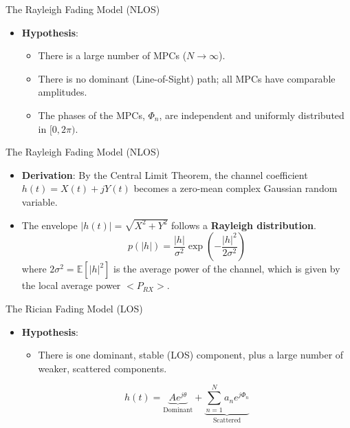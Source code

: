 \documentclass{beamer}
\begin{document}
	\begin{frame}{The Rayleigh Fading Model (NLOS)}
		\begin{itemize}
			\item \textbf{Hypothesis}:
			\begin{itemize}
				\item There is a large number of MPCs ($N \to \infty$).
				\item There is no dominant (Line-of-Sight) path; all MPCs have comparable amplitudes.
				\item The phases of the MPCs, $\Phi_n$, are independent and uniformly distributed in $[0, 2\pi)$.
			\end{itemize}
		\end{itemize}
	\end{frame}
	
	\begin{frame}{The Rayleigh Fading Model (NLOS)}
		\begin{itemize}
			\item \textbf{Derivation}: By the Central Limit Theorem, the channel coefficient $h(t) = X(t) + jY(t)$ becomes a zero-mean complex Gaussian random variable.
			\item The envelope $|h(t)| = \sqrt{X^2 + Y^2}$ follows a \textbf{Rayleigh distribution}.
			\[ p(|h|) = \frac{|h|}{\sigma^2} \exp\left(-\frac{|h|^2}{2\sigma^2}\right) \]
			where $2\sigma^2 = \mathbb{E}[|h|^2]$ is the average power of the channel, which is given by the local average power $<P_{RX}>$.
		\end{itemize}
	\end{frame}
	
	\begin{frame}{The Rician Fading Model (LOS)}
		\begin{itemize}
			\item \textbf{Hypothesis}:
			\begin{itemize}
				\item There is one dominant, stable (LOS) component, plus a large number of weaker, scattered components.
			\end{itemize}
			\[ h(t) = \underbrace{A e^{j\theta}}_{\text{Dominant}} + \underbrace{\sum_{n=1}^{N} a_n e^{j\Phi_n}}_{\text{Scattered}} \]
		\end{itemize}
	\end{frame}
	
\end{document}
